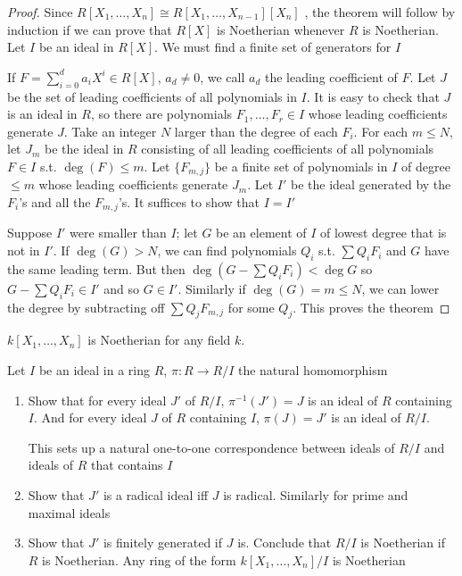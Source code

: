 \documentclass[11pt]{article}
\begin{document}
\begin{proof}
Since \(R[X_1,\dots,X_n]\cong R[X_1,\dots,X_{n-1}][X_n]\) , the theorem will follow by induction if we can
prove that \(R[X]\) is Noetherian whenever \(R\) is Noetherian. Let \(I\) be an ideal
in \(R[X]\). We must find a finite set of generators for \(I\)

If \(F=\sum_{i=0}^da_iX^i\in R[X]\), \(a_d\neq 0\), we call \(a_d\) the leading coefficient of \(F\).
Let \(J\) be the set of leading coefficients of all polynomials in \(I\). It is easy to check
that \(J\) is an ideal in \(R\), so there are polynomials \(F_1,\dots,F_r\in I\) whose leading
coefficients generate \(J\). Take an integer \(N\) larger than the degree of each \(F_i\). For
each \(m\le N\), let \(J_m\) be the ideal in \(R\) consisting of all leading coefficients of all
polynomials \(F\in I\) s.t. \(\deg(F)\le m\). Let \(\{F_{m,j}\}\) be a finite set of polynomials
in \(I\) of degree \(\le m\) whose leading coefficients generate \(J_m\). Let \(I'\) be the ideal
generated by the \(F_i\)'s and all the \(F_{m,j}\)'s. It suffices to show that \(I=I'\)

Suppose \(I'\) were smaller than \(I\); let \(G\) be an element of \(I\) of lowest degree that
is not in \(I'\). If \(\deg(G)>N\), we can find polynomials \(Q_i\) s.t. \(\sum Q_iF_i\) and \(G\)
have the same leading term. But then \(\deg(G-\sum Q_iF_i)<\deg G\) so \(G-\sum Q_iF_i\in I'\) and
so \(G\in I'\).  Similarly if \(\deg(G)=m\le N\), we can lower the degree by subtracting
off \(\sum Q_jF_{m,j}\) for some \(Q_j\). This proves the theorem
\end{proof}

\begin{corollary}[]
\(k[X_1,\dots,X_n]\) is Noetherian for any field \(k\).
\end{corollary}

\begin{exercise}
\label{ex1.22}
Let \(I\) be an ideal in a ring \(R\), \(\pi:R\to R/I\) the natural homomorphism
\begin{enumerate}
\item Show that for every ideal \(J'\) of \(R/I\), \(\pi^{-1}(J')=J\) is an ideal of \(R\)
containing \(I\). And for every ideal \(J\) of \(R\) containing \(I\), \(\pi(J)=J'\) is an
ideal of \(R/I\).

This sets up a natural one-to-one correspondence between ideals of \(R/I\) and ideals
of \(R\) that contains \(I\)

\item Show that \(J'\) is a radical ideal iff \(J\) is radical. Similarly for prime and maximal ideals

\item Show that \(J'\) is finitely generated if \(J\) is. Conclude that \(R/I\) is Noetherian
if \(R\) is Noetherian. Any ring of the form \(k[X_1,\dots,X_n]/I\) is Noetherian
\end{enumerate}
\end{exercise}
\end{document}
